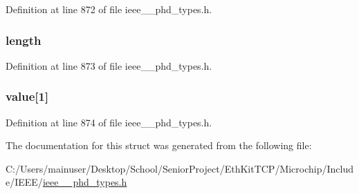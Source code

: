 Definition at line 872 of file ieee\+\_\+\_\+phd\+\_\+types.\+h.

\hypertarget{struct___supplemental_type_list_a3743679e4ff85e3e1b3fc2e59973fbb3}{}
\subsubsection[{length}]{ length}\label{struct___supplemental_type_list_a3743679e4ff85e3e1b3fc2e59973fbb3}


Definition at line 873 of file ieee\+\_\+\_\+phd\+\_\+types.\+h.

\hypertarget{struct___supplemental_type_list_aca3607d9103cdb241f17f92581108e4e}{}
\subsubsection[{value}]{ value\mbox{[}1\mbox{]}}\label{struct___supplemental_type_list_aca3607d9103cdb241f17f92581108e4e}


Definition at line 874 of file ieee\+\_\+\_\+phd\+\_\+types.\+h.



The documentation for this struct was generated from the following file\+:\begin{DoxyCompactItemize}
\item 
C\+:/\+Users/mainuser/\+Desktop/\+School/\+Senior\+Project/\+Eth\+Kit\+T\+C\+P/\+Microchip/\+Include/\+I\+E\+E\+E/\hyperlink{ieee__11073__phd__types_8h}{ieee\+\_\+\_\+phd\+\_\+types.\+h}\end{DoxyCompactItemize}
